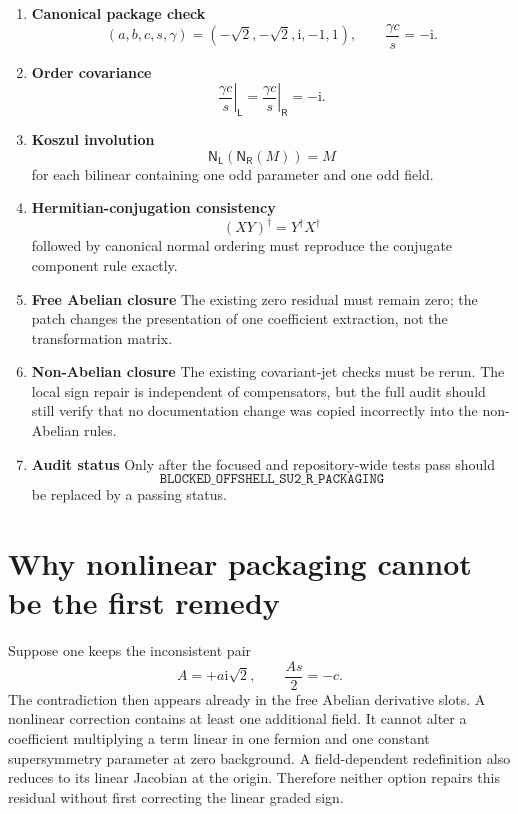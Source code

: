 \documentclass[11pt,a4paper,UTF8]{ctexart}
\numberwithin{equation}{section}
\newcommand{\ii}{\mathrm i}
\newcommand{\PL}{\mathsf L}
\newcommand{\PR}{\mathsf R}
\begin{document}
\begin{enumerate}
\item \textbf{Canonical package check}
\[
(a,b,c,s,\gamma)=(-\sqrt2,-\sqrt2,\ii,-1,1),
\qquad
\frac{\gamma c}{s}=-\ii.
\]

\item \textbf{Order covariance}
\[
\left.\frac{\gamma c}{s}\right|_{\PL}
=
\left.\frac{\gamma c}{s}\right|_{\PR}
=-\ii.
\]

\item \textbf{Koszul involution}
\[
\mathsf N_{\PL}\!\left(\mathsf N_{\PR}(M)\right)=M
\]
for each bilinear containing one odd parameter and one odd field.

\item \textbf{Hermitian-conjugation consistency}
\[
(XY)^\dagger=Y^\dagger X^\dagger
\]
followed by canonical normal ordering must reproduce the conjugate component rule exactly.

\item \textbf{Free Abelian closure}
The existing zero residual must remain zero; the patch changes the presentation of one coefficient extraction, not the transformation matrix.

\item \textbf{Non-Abelian closure}
The existing covariant-jet checks must be rerun. The local sign repair is independent of compensators, but the full audit should still verify that no documentation change was copied incorrectly into the non-Abelian rules.

\item \textbf{Audit status}
Only after the focused and repository-wide tests pass should
\[
\texttt{BLOCKED\_OFFSHELL\_SU2\_R\_PACKAGING}
\]
be replaced by a passing status.
\end{enumerate}

\section{Why nonlinear packaging cannot be the first remedy}

Suppose one keeps the inconsistent pair
\[
A=+a\ii\sqrt2,
\qquad
\frac{As}{2}=-c.
\]
The contradiction then appears already in the free Abelian derivative slots. A nonlinear correction contains at least one additional field. It cannot alter a coefficient multiplying a term linear in one fermion and one constant supersymmetry parameter at zero background. A field-dependent redefinition also reduces to its linear Jacobian at the origin. Therefore neither option repairs this residual without first correcting the linear graded sign.
\end{document}
